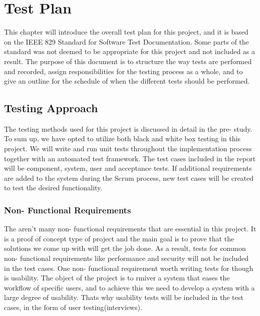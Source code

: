\chapter{Test Plan}

\minitoc

This chapter will introduce the overall test plan for this project, and it is based on the IEEE 829 Standard for Software Test Documentation\cite{testing-standard}. Some parts of the standard was not deemed to be appropriate for this project and not included as a result. The purpose of this document is to structure the way tests are performed and recorded, assign responsibilities for the testing process as a whole, and to give an outline for the schedule of when the different tests should be performed.

\clearpage

\section{Testing Approach}
The testing methods used for this project is discussed in detail in the pre- study. To sum up, we have opted to utilize both black and white box testing in this project. We will write and run unit tests throughout the implementation process together with an automated test framework. The test cases included in the report will be component, system, user and acceptance tests. If additional requirements are added to the system during the Scrum process, new test cases will be created to test the desired functionality.

\subsection{Non- Functional Requirements}
The aren't many non- functional requirements that are essential in this project. It is a proof of concept type of project and the main goal is to prove that the solutions we come up with will get the job done. As a result, tests for common non- functional requirements like performance and security will not be included in the test cases. One non- functional requirement worth writing tests for though is usability. The object of the project is to rmiver a system that eases the workflow of specific users, and to achieve this we need to develop a system with a large degree of usability. Thats why usability tests will be included in the test cases, in the form of user testing(interviews).

